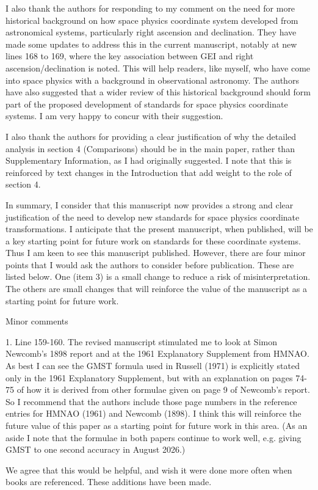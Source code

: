 \documentclass[11pt]{article}
\begin{document}
I also thank the authors for responding to my comment on the need for more historical background on how space physics coordinate system developed from astronomical systems, particularly right ascension and declination. They have made some updates to address this in the current manuscript, notably at new lines 168 to 169, where the key association between GEI and right ascension/declination is noted. This will help
readers, like myself, who have come into space physics with a background in observational astronomy. The authors have also suggested that a wider review of this historical background should form part of the proposed development of standards for space physics coordinate systems. I am very happy to concur with their suggestion.

I also thank the authors for providing a clear justification of why the detailed analysis in section 4 (Comparisons) should be in the main paper, rather than Supplementary Information, as I had originally suggested. I note that this is reinforced by text changes in the Introduction that add weight to the role of section 4.

In summary, I consider that this manuscript now provides a strong and clear justification of the need to develop new standards for space physics coordinate transformations. I anticipate that the present manuscript, when published, will be a key starting point for future work on standards for these coordinate systems. Thus I am keen to see this manuscript published. However, there are four minor points that I would ask the authors to consider before publication. These are listed below. One (item 3) is a small change to reduce a risk of misinterpretation. The others are small changes that will reinforce the value of the manuscript as a starting point for future work.

Minor comments

1. Line 159-160. The revised manuscript stimulated me to look at Simon Newcomb’s 1898 report and at the 1961 Explanatory Supplement from HMNAO. As best I can see the GMST formula used in Russell (1971) is explicitly stated only in the 1961 Explanatory Supplement, but with an explanation on pages 74-75 of how it is derived from other formulae given on page 9 of Newcomb’s report. So I recommend that the authors include those page numbers in the reference entries for HMNAO (1961) and Newcomb (1898). I think this will reinforce the future value of this paper as a starting point for future work in this area. (As an aside I note that the formulae in both papers continue to work well, e.g. giving GMST to one second accuracy in August 2026.)
\\
{\color{violet}
\begin{leftbar}
We agree that this would be helpful, and wish it were done more often when books are referenced. These additions have been made.
\end{leftbar}
}
\end{document}

